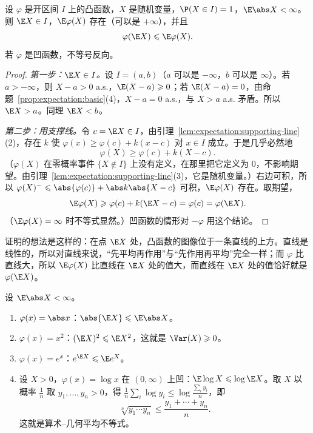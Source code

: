 \begin{theorem}\label{thm:expectation:jensen}
设 $\varphi$ 是开区间 $I$ 上的凸函数，$X$ 是随机变量，$\P(X\in I)=1$，$\E\abs X<\infty$。则 $\E X\in I$，$\E\varphi(X)$ 存在（可以是 $+\infty$），并且
\[
\varphi(\E X)\leqslant \E\varphi(X).
\]
若 $\varphi$ 是凹函数，不等号反向。
\end{theorem}
\begin{proof}
\emph{第一步：$\E X\in I$。}设 $I=(a,b)$（$a$ 可以是 $-\infty$，$b$ 可以是 $\infty$）。若 $a>-\infty$，则 $X-a>0$ a.s.，$\E(X-a)\geqslant0$；若 $\E(X-a)=0$，由命题~\ref{prop:expectation:basic}(4)，$X-a=0$ a.s.，与 $X>a$ a.s. 矛盾。所以 $\E X>a$。同理 $\E X<b$。

\emph{第二步：用支撑线。}令 $c=\E X\in I$，由引理~\ref{lem:expectation:supporting-line}(2)，存在 $k$ 使 $\varphi(x)\geqslant\varphi(c)+k(x-c)$ 对 $x\in I$ 成立。于是几乎必然地
\[
\varphi(X)\geqslant\varphi(c)+k(X-c).
\]
（$\varphi(X)$ 在零概率事件 $\{X\notin I\}$ 上没有定义，在那里把它定义为 $0$，不影响期望。由引理~\ref{lem:expectation:supporting-line}(3)，它是随机变量。）右边可积，所以 $\varphi(X)^-\leqslant\abs{\varphi(c)}+\abs k\abs{X-c}$ 可积，$\E\varphi(X)$ 存在。取期望，
\[
\E\varphi(X)\geqslant\varphi(c)+k(\E X-c)=\varphi(c)=\varphi(\E X).
\]
（$\E\varphi(X)=\infty$ 时不等式显然。）凹函数的情形对 $-\varphi$ 用这个结论。
\end{proof}

\begin{remark}
证明的想法是这样的：在点 $\E X$ 处，凸函数的图像位于一条直线的上方。直线是线性的，所以对直线来说，“先平均再作用”与“先作用再平均”完全一样；而 $\varphi$ 比直线大，所以 $\E\varphi(X)$ 比直线在 $\E X$ 处的值大，而直线在 $\E X$ 处的值恰好就是 $\varphi(\E X)$。
\end{remark}

\begin{example}\label{ex:expectation:jensen}
设 $\E\abs X<\infty$。
\begin{enumerate}
\item $\varphi(x)=\abs x$：$\abs{\E X}\leqslant \E\abs X$。
\item $\varphi(x)=x^2$：$(\E X)^2\leqslant \E X^2$，这就是 $\Var(X)\geqslant0$。
\item $\varphi(x)=e^x$：$e^{\E X}\leqslant \E e^X$。
\item 设 $X>0$，$\varphi(x)=\log x$ 在 $(0,\infty)$ 上凹：$\E\log X\leqslant\log \E X$。取 $X$ 以概率 $\frac1n$ 取 $y_1,\dots,y_n>0$，得 $\frac1n\sum_i\log y_i\leqslant\log\frac{\sum_iy_i}n$，即
\[
\sqrt[n]{y_1\cdots y_n}\leqslant\frac{y_1+\cdots+y_n}n .
\]
这就是算术--几何平均不等式。
\end{enumerate}
\end{example}

